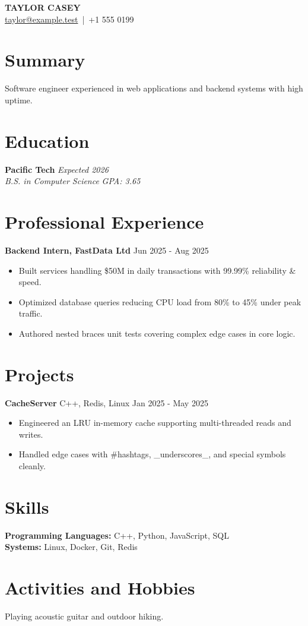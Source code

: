 \documentclass[10pt]{article}
\newcommand{\experienceitem}[4]{\textbf{#1} #2 #3 #4}
\newcommand{\projectitem}[4]{\textbf{#1} #2 #3 #4}
\begin{document}
\begin{center}
{\Large \textbf{TAYLOR CASEY}}\\
\href{mailto:taylor@example.test}{taylor@example.test} \,|\, +1 555 0199
\end{center}

\section{Summary}
Software engineer experienced in web applications and backend systems with high uptime.

\section{Education}
\noindent\textbf{Pacific Tech} \hfill \textit{Expected 2026}\\
\textit{B.S. in Computer Science} \hfill \textit{GPA: 3.65}

\section{Professional Experience}
\experienceitem{Backend Intern, FastData Ltd}{Jun 2025 - Aug 2025}{}{
\begin{itemize}[leftmargin=12pt]
  \item Built services handling \$50M in daily transactions with 99.99\% reliability \& speed.
  \item Optimized database queries reducing CPU load from 80\% to 45\% under peak traffic.
  \item Authored {{nested {braces}}} unit tests covering complex edge cases in core logic.
\end{itemize}}

\section{Projects}
\projectitem{CacheServer}{C++, Redis, Linux}{Jan 2025 - May 2025}{
\begin{itemize}[leftmargin=12pt]
  \item Engineered an LRU in-memory cache supporting multi-threaded reads and writes.
  \item Handled edge cases with \#hashtags, \_underscores\_, and special symbols cleanly.
\end{itemize}}

\section{Skills}
\noindent\textbf{Programming Languages:} C++, Python, JavaScript, SQL\\
\textbf{Systems:} Linux, Docker, Git, Redis

\section{Activities and Hobbies}
Playing acoustic guitar and outdoor hiking.
\end{document}
